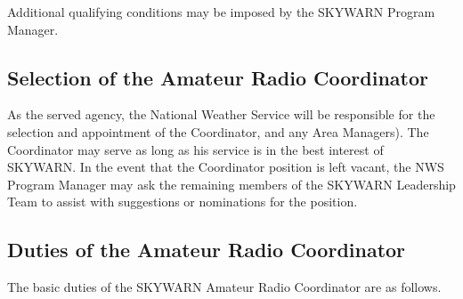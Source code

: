 \documentclass[pdflatex,letterpaper,twoside,12pt]{book}
\begin{document}
Additional qualifying conditions may be imposed by the SKYWARN Program Manager.

\subsection{Selection of the Amateur Radio Coordinator}

As the served agency, the National Weather Service will be responsible for the selection and appointment of the Coordinator, and any Area Managers).  The Coordinator may serve as long as his service is in the best interest of SKYWARN.  In the event that the Coordinator position is left vacant, the NWS Program Manager may ask the remaining members of the SKYWARN Leadership Team to assist with suggestions or nominations for the position.

\subsection{Duties of the Amateur Radio Coordinator}

The basic duties of the SKYWARN Amateur Radio Coordinator are as follows.
\end{document}
